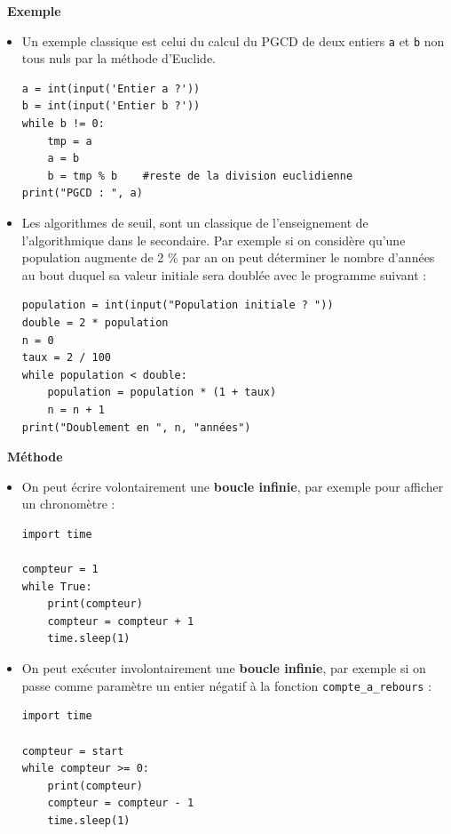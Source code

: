 \documentclass[a4paper, french, 12pt]{article}  %
\newcounter{thme}
\newcounter{exple}
\newenvironment{exemple}[1]
{\par \medskip   \addtocounter{exple}{1} \noindent  
\begin{bclogo}[arrondi =0.1,   noborder = true, logo=\bclampe, marge=4]{~\textbf{Exemple} \textbf{\theexple} {\itshape #1} }  \par}
{
\end{bclogo}
 \par \bigskip }
\newcounter{alg}
\newcounter{prog}
\newenvironment{methode}[1]
{\par \medskip    \noindent  
 \begin {bclogo}[arrondi =0.1,logo=\bcoutil, marge=4,noborder = true] {~\textbf{Méthode}   {\itshape #1} }  \par}
{
\end{bclogo}
 \par \bigskip }
\begin{document}
\begin{exemple}{}

\begin{itemize}

\item Un exemple classique est celui du calcul du PGCD de deux entiers \texttt{a} et \texttt{b} non tous nuls par la méthode d'Euclide.

\begin{lstlisting}[style=rond]
a = int(input('Entier a ?'))
b = int(input('Entier b ?'))
while b != 0:
	tmp = a
	a = b 
	b = tmp % b    #reste de la division euclidienne
print("PGCD : ", a)
\end{lstlisting}

\item Les algorithmes de seuil, sont un classique de l'enseignement de l'algorithmique dans le secondaire. Par exemple si on considère qu'une population augmente de 2 \% par an on peut déterminer le nombre d'années au bout duquel sa valeur initiale sera doublée avec le programme suivant : 

\medskip

\begin{lstlisting}[style=rond]
population = int(input("Population initiale ? "))
double = 2 * population
n = 0
taux = 2 / 100
while population < double:
	population = population * (1 + taux)
	n = n + 1
print("Doublement en ", n, "années")	
\end{lstlisting}

\end{itemize}
\end{exemple}

\vspace*{-15pt}

\begin{methode}{}

\begin{itemize}

\item On peut écrire volontairement une  \textbf{boucle infinie}, par exemple pour afficher un chronomètre :

\begin{lstlisting}[style=rond]
import time

compteur = 1
while True:		
	print(compteur)
	compteur = compteur + 1
	time.sleep(1)
\end{lstlisting}

\item On peut exécuter involontairement une \textbf{boucle infinie}, par exemple si on passe comme  paramètre un entier négatif à la fonction \verb+compte_a_rebours+ :


\begin{lstlisting}[style=rond]
import time

compteur = start
while compteur >= 0:
	print(compteur)		
	compteur = compteur - 1
	time.sleep(1)
\end{lstlisting}

\end{itemize}
\end{methode}
\end{document}
